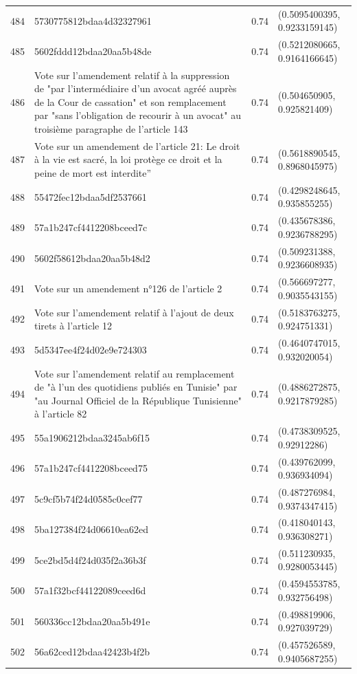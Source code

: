 \begin{table}[ht]
\begin{tabular}{rlrl}
  484 & 5730775812bdaa4d32327961 & 0.74 & (0.5095400395, 0.9233159145) \\ 
  485 & 5602fddd12bdaa20aa5b48de & 0.74 & (0.5212080665, 0.9164166645) \\ 
  486 & Vote sur l'amendement relatif à la suppression de "par l’intermédiaire d’un avocat agréé auprès de la Cour de cassation" et son remplacement par "sans l'obligation de recourir à un avocat" au troisième paragraphe de l'article 143 & 0.74 & (0.504650905, 0.925821409) \\ 
  487 & Vote sur un amendement de l'article 21: Le droit à la vie est sacré, la loi protège ce droit et la peine de mort est interdite” & 0.74 & (0.5618890545, 0.8968045975) \\ 
  488 & 55472fec12bdaa5df2537661 & 0.74 & (0.4298248645, 0.935855255) \\ 
  489 & 57a1b247cf4412208bceed7c & 0.74 & (0.435678386, 0.9236788295) \\ 
  490 & 5602f58612bdaa20aa5b48d2 & 0.74 & (0.509231388, 0.9236608935) \\ 
  491 & Vote sur un amendement n°126 de l'article 2 & 0.74 & (0.566697277, 0.9035543155) \\ 
  492 & Vote sur l'amendement relatif à l'ajout de deux tirets à l'article 12 & 0.74 & (0.5183763275, 0.924751331) \\ 
  493 & 5d5347ee4f24d02e9e724303 & 0.74 & (0.4640747015, 0.932020054) \\ 
  494 & Vote sur l'amendement relatif au remplacement de "à l’un des quotidiens publiés en Tunisie" par "au Journal Officiel de la République Tunisienne" à l'article 82 & 0.74 & (0.4886272875, 0.9217879285) \\ 
  495 & 55a1906212bdaa3245ab6f15 & 0.74 & (0.4738309525, 0.92912286) \\ 
  496 & 57a1b247cf4412208bceed75 & 0.74 & (0.439762099, 0.936934094) \\ 
  497 & 5c9cf5b74f24d0585c0cef77 & 0.74 & (0.487276984, 0.9374347415) \\ 
  498 & 5ba127384f24d06610ea62ed & 0.74 & (0.418040143, 0.936308271) \\ 
  499 & 5ce2bd5d4f24d035f2a36b3f & 0.74 & (0.511230935, 0.9280053445) \\ 
  500 & 57a1f32bcf44122089ceed6d & 0.74 & (0.4594553785, 0.932756498) \\ 
  501 & 560336cc12bdaa20aa5b491e & 0.74 & (0.498819906, 0.927039729) \\ 
  502 & 56a62ced12bdaa42423b4f2b & 0.74 & (0.457526589, 0.9405687255) \\ 

\end{tabular}
\end{table}
